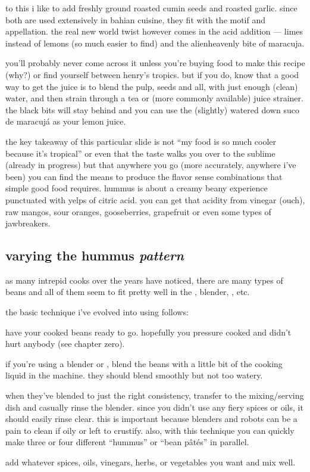 to this i like to add freshly ground roasted cumin seeds and roasted
garlic. since both are used extensively in bahian cuisine, they fit
with the motif and appellation. the real new world twist however comes
in the acid addition --- limes instead of lemons (so much easier to
find) and the alienheavenly bite of \gls{maracuja}.

you'll probably never come across it unless you're buying food
to make this recipe (why?) or find yourself between henry's
tropics. but if you do, know that a good way to get the juice is to
blend the pulp, seeds and all, with just enough (clean) water, and
then strain through a tea or (more commonly available) juice
strainer. the black bits will stay behind and you can use the
(slightly) watered down suco de maracuj\'{a} as your lemon juice.

the key takeaway of this particular slide is not ``my food is so
much cooler because it's tropical'' or even that the taste walks
you over to the sublime (already in progress) but that anywhere you go
(more accurately, anywhere i've been) you can find the means to
produce the flavor sense combinations that simple good food
requires. \gls{hummus} is about a creamy beany experience punctuated with
yelps of citric acid. you can get that acidity from vinegar (ouch),
raw mangos, sour oranges, gooseberries, grapefruit or even some types
of jawbreakers.

\subsection{varying the hummus \textit{pattern}}

as many intrepid cooks over the years have noticed, there are many
types of beans and all of them seem to fit pretty well in the ,
blender, , etc.

the basic technique i've evolved into using follows:

\begin{algorithm}
  \item have your cooked beans ready to go. hopefully you pressure
  cooked and didn't hurt anybody (see chapter zero).

  \item if you're using a blender or , blend the beans with a
  little bit of the cooking liquid in the machine. they should blend
  smoothly but not too watery.

  \item when they've blended to just the right consistency,
  transfer to the mixing/serving dish and casually rinse the
  blender. since you didn't use any fiery spices or oils, it should
  easily rinse clear. this is important because blenders and robots
  can be a pain to clean if oily or left to crustify. also, with this
  technique you can quickly make three or four different
  ``\gls{hummus}'' or ``bean p\^{a}t\'{e}s'' in parallel.

  \item add whatever spices, oils, vinegars, herbs, or vegetables you
  want and mix well.
\end{algorithm}

